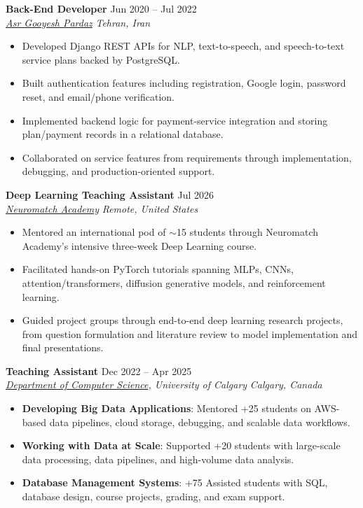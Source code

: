 \documentclass[a4paper,10pt]{article}
\newcommand{\resumeSubheading}[4]{
    \textbf{#1} \hfill #2 \\
    \textit{#3} \hfill \textit{#4}
}
\begin{document}
\resumeSubheading
{Back-End Developer}
{Jun 2020 -- Jul 2022}
{\href{https://asr-gooyesh.com/en/}{Asr Gooyesh Pardaz}}
{Tehran, Iran}
\begin{itemize}[leftmargin=0.25in]
    \item Developed Django REST APIs for NLP, text-to-speech, and speech-to-text service plans backed by PostgreSQL.
    \item Built authentication features including registration, Google login, password reset, and email/phone verification.
    \item Implemented backend logic for payment-service integration and storing plan/payment records in a relational database.
    \item Collaborated on service features from requirements through implementation, debugging, and production-oriented support.
\end{itemize}

\resumeSubheading
{Deep Learning Teaching Assistant}
{Jul 2026}
{\href{https://neuromatch.io/}{Neuromatch Academy}}
{Remote, United States}
\begin{itemize}[leftmargin=0.25in]
    \item Mentored an international pod of $\sim$15 students through Neuromatch Academy's intensive three-week Deep Learning course.
    \item Facilitated hands-on PyTorch tutorials spanning MLPs, CNNs, attention/transformers, diffusion generative models, and reinforcement learning.
    \item Guided project groups through end-to-end deep learning research projects, from question formulation and literature review to model implementation and final presentations.
\end{itemize}

\resumeSubheading
{Teaching Assistant}
{Dec 2022 -- Apr 2025}
{\href{https://science.ucalgary.ca/computer-science} {Department of Computer Science}, University of Calgary}
{Calgary, Canada}
\begin{itemize}[leftmargin=0.25in]
    \item \textbf{Developing Big Data Applications}: Mentored +25 students on AWS-based data pipelines, cloud storage, debugging, and scalable data workflows. 
    \item \textbf{Working with Data at Scale}: Supported +20 students with large-scale data processing, data pipelines, and high-volume data analysis. 
    \item \textbf{Database Management Systems}: +75 Assisted students with SQL, database design, course projects, grading, and exam support.
\end{itemize}
\end{document}

